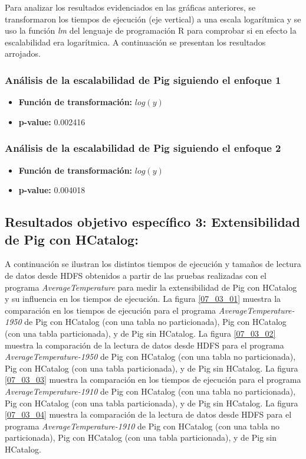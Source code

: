 Para analizar los resultados evidenciados en las gráficas anteriores, se transformaron los tiempos de ejecución (eje vertical) a una escala logarítmica y se uso la función \textit{lm} del lenguaje de programación R para comprobar si en efecto la escalabilidad era logarítmica. A continuación se presentan los resultados arrojados. \\

\subsubsection{Análisis de la escalabilidad de Pig siguiendo el enfoque 1}

\begin{itemize}

\item \textbf{Función de transformación:} $log(y)$
\item \textbf{p-value:} 0.002416

\end{itemize}

\subsubsection{Análisis de la escalabilidad de Pig siguiendo el enfoque 2}

\begin{itemize}

\item \textbf{Función de transformación:} $log(y)$
\item \textbf{p-value:} 0.004018

\end{itemize}

\subsection{Resultados objetivo específico 3: Extensibilidad de Pig con HCatalog:}

A continuación se ilustran los distintos tiempos de ejecución y tamaños de lectura de datos desde HDFS obtenidos a partir de las pruebas realizadas con el programa \textit{AverageTemperature} para medir la extensibilidad de Pig con HCatalog y su influencia en los tiempos de ejecución. La figura \ref{07_03_01} muestra la comparación en los tiempos de ejecución para el programa \textit{AverageTemperature-1950} de Pig con HCatalog (con una tabla no particionada), Pig con HCatalog (con una tabla particionada), y de Pig sin HCatalog. La figura \ref{07_03_02} muestra la comparación de la lectura de datos desde HDFS para el programa \textit{AverageTemperature-1950} de Pig con HCatalog (con una tabla no particionada), Pig con HCatalog (con una tabla particionada), y de Pig sin HCatalog. La figura \ref{07_03_03} muestra la comparación en los tiempos de ejecución para el programa \textit{AverageTemperature-1910} de Pig con HCatalog (con una tabla no particionada), Pig con HCatalog (con una tabla particionada), y de Pig sin HCatalog. La figura \ref{07_03_04} muestra la comparación de la lectura de datos desde HDFS para el programa \textit{AverageTemperature-1910} de Pig con HCatalog (con una tabla no particionada), Pig con HCatalog (con una tabla particionada), y de Pig sin HCatalog.


